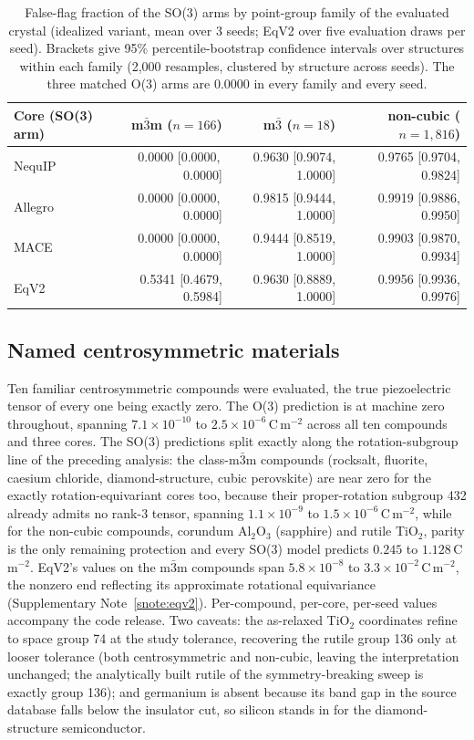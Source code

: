 \begin{table}[htbp]
\centering
\caption{False-flag fraction of the SO(3) arms by point-group family of the evaluated crystal (idealized variant, mean over 3 seeds; EqV2 over five evaluation draws per seed). Brackets give 95\% percentile-bootstrap confidence intervals over structures within each family (2,000 resamples, clustered by structure across seeds). The three matched O(3) arms are 0.0000 in every family and every seed.}
\label{stab:e7}
\scriptsize
\begin{tabular*}{\textwidth}{@{\extracolsep{\fill}}lrrr}
\toprule
Core (SO(3) arm) & m$\bar 3$m ($n{=}166$) & m$\bar 3$ ($n{=}18$) & non-cubic ($n{=}1{,}816$) \\
\midrule
NequIP & 0.0000 [0.0000,\,0.0000] & 0.9630 [0.9074, 1.0000] & 0.9765 [0.9704, 0.9824] \\
Allegro & 0.0000 [0.0000,\,0.0000] & 0.9815 [0.9444, 1.0000] & 0.9919 [0.9886, 0.9950] \\
MACE & 0.0000 [0.0000,\,0.0000] & 0.9444 [0.8519, 1.0000] & 0.9903 [0.9870, 0.9934] \\
EqV2 & 0.5341 [0.4679, 0.5984] & 0.9630 [0.8889, 1.0000] & 0.9956 [0.9936, 0.9976] \\
\bottomrule
\end{tabular*}
\end{table}

\subsection*{Named centrosymmetric materials}

Ten familiar centrosymmetric compounds were evaluated, the true piezoelectric tensor of every one being exactly zero. The O(3) prediction is at machine zero throughout, spanning $7.1\times10^{-10}$ to $2.5\times10^{-6}$\,C\,m$^{-2}$ across all ten compounds and three cores. The SO(3) predictions split exactly along the rotation-subgroup line of the preceding analysis: the class-m$\bar 3$m compounds (rocksalt, fluorite, caesium chloride, diamond-structure, cubic perovskite) are near zero for the exactly rotation-equivariant cores too, because their proper-rotation subgroup 432 already admits no rank-3 tensor, spanning $1.1\times10^{-9}$ to $1.5\times10^{-6}$\,C\,m$^{-2}$, while for the non-cubic compounds, corundum Al$_2$O$_3$ (sapphire) and rutile TiO$_2$, parity is the only remaining protection and every SO(3) model predicts $0.245$ to $1.128$\,C\,m$^{-2}$. EqV2's values on the m$\bar 3$m compounds span $5.8\times10^{-8}$ to $3.3\times10^{-2}$\,C\,m$^{-2}$, the nonzero end reflecting its approximate rotational equivariance (Supplementary Note~\ref{snote:eqv2}). Per-compound, per-core, per-seed values accompany the code release. Two caveats: the as-relaxed TiO$_2$ coordinates refine to space group 74 at the study tolerance, recovering the rutile group 136 only at looser tolerance (both centrosymmetric and non-cubic, leaving the interpretation unchanged; the analytically built rutile of the symmetry-breaking sweep is exactly group 136); and germanium is absent because its band gap in the source database falls below the insulator cut, so silicon stands in for the diamond-structure semiconductor.



